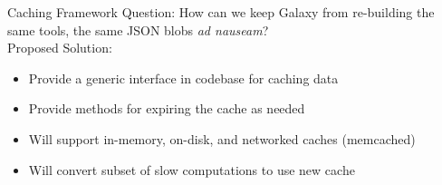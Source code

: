 \documentclass[12pt]{ufrslides}
\begin{document}
	\begin{frame}{Caching Framework}
		Question: How can we keep Galaxy from re-building the same tools, the same JSON blobs \textit{ad nauseam}?\\[0.6cm]
		Proposed Solution:
		\begin{itemize}
			\item Provide a generic interface in codebase for caching data
			\item Provide methods for expiring the cache as needed
			\item Will support in-memory, on-disk, and networked caches (memcached)
			\item Will convert subset of slow computations to use new cache
		\end{itemize}
	\end{frame}
\end{document}
